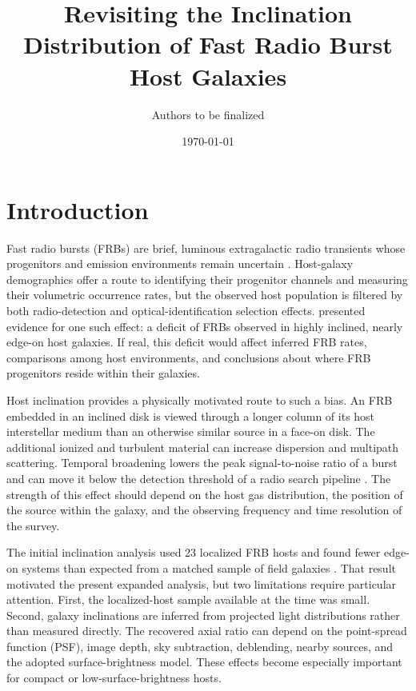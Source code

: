 \documentclass[10pt,twocolumn]{article}
\begin{document}
\title{Revisiting the Inclination Distribution of Fast Radio Burst Host Galaxies}
\author{Authors to be finalized}
\date{\today}
\maketitle


\section{Introduction}
\label{sec:introduction}

Fast radio bursts (FRBs) are brief, luminous extragalactic radio transients
whose progenitors and emission environments remain uncertain
\citep[e.g.,][]{CordesChatterjee2019,Petroff2022}.  Host-galaxy demographics
offer a route to identifying their progenitor channels and measuring their
volumetric occurrence rates, but the observed host population is filtered by
both radio-detection and optical-identification selection effects.
\citet{2024Natur.634.1065B} presented evidence for one such effect: a deficit
of FRBs observed in highly inclined, nearly edge-on host galaxies.  If real,
this deficit would affect inferred FRB rates, comparisons among host
environments, and conclusions about where FRB progenitors reside within their
galaxies.

Host inclination provides a physically motivated route to such a bias.  An
FRB embedded in an inclined disk is viewed through a longer column of its
host interstellar medium than an otherwise similar source in a face-on disk.
The additional ionized and turbulent material can increase dispersion and
multipath scattering.  Temporal broadening lowers the peak signal-to-noise
ratio of a burst and can move it below the detection threshold of a radio
search pipeline \citep{Chawla2022,Ocker2022}.  The strength of this effect
should depend on the host gas distribution, the position of the source within
the galaxy, and the observing frequency and time resolution of the survey.

The initial inclination analysis used 23 localized FRB hosts and found fewer
edge-on systems than expected from a matched sample of field galaxies
\citep{2024Natur.634.1065B}.  That result motivated the present expanded
analysis, but two limitations require particular attention.  First, the
localized-host sample available at the time was small.  Second, galaxy
inclinations are inferred from projected light distributions rather than
measured directly.  The recovered axial ratio can depend on the point-spread
function (PSF), image depth, sky subtraction, deblending, nearby sources, and
the adopted surface-brightness model.  These effects become especially
important for compact or low-surface-brightness hosts.
\end{document}
